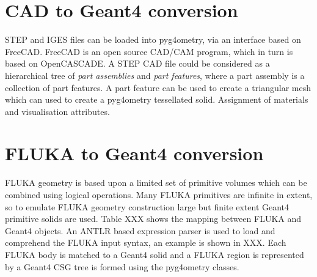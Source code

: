 \documentclass[final,5p,times,twocolumn]{elsarticle}
\begin{document}
\section{CAD to Geant4 conversion }
STEP and IGES files can be loaded into pyg4ometry, via an interface based on FreeCAD. FreeCAD is an open source CAD/CAM program, which in turn 
is based on OpenCASCADE. A STEP CAD file could be considered as a hierarchical tree of {\it part assemblies} and {\it part features}, where a part assembly is a 
collection of part features. A part feature can be used to create  a triangular mesh which can used to create a pyg4ometry tessellated solid. Assignment of materials 
and visualisation attributes. 

\section{FLUKA to Geant4 conversion}
FLUKA geometry is based upon a limited set of primitive volumes which can be combined using logical operations. Many FLUKA primitives are infinite in extent, so 
to emulate FLUKA geometry construction large but finite extent Geant4 primitive solids are used. Table XXX shows the mapping between FLUKA and Geant4 objects.
An ANTLR based expression parser is used to load and comprehend the FLUKA input syntax, an example is shown in XXX. Each FLUKA body is matched to a Geant4 
solid and a FLUKA region is represented by a Geant4 CSG tree is formed using the pyg4ometry classes. 
\end{document}

